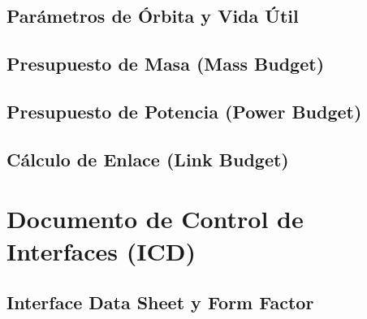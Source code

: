 \subsection{Parámetros de Órbita y Vida Útil}

\subsection{Presupuesto de Masa (Mass Budget)}

\subsection{Presupuesto de Potencia (Power Budget)}

\subsection{Cálculo de Enlace (Link Budget)}

\section{Documento de Control de Interfaces (ICD)}
\subsection{Interface Data Sheet y Form Factor}
